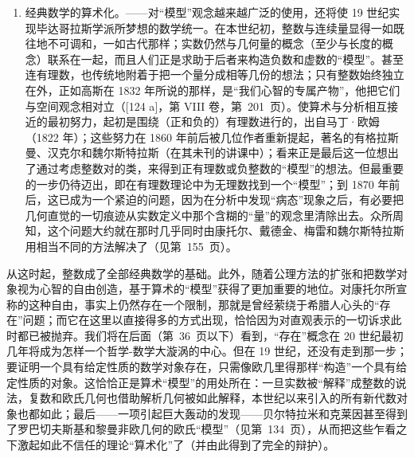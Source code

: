 \begin{enumerate}
\item
  经典数学的算术化。——对“模型”观念越来越广泛的使用，还将使 19 世纪实现毕达哥拉斯学派所梦想的数学统一。在本世纪初，整数与连续量显得一如既往地不可调和，一如古代那样；实数仍然与几何量的概念（至少与长度的概念）联系在一起，而且人们正是求助于后者来构造负数和虚数的“模型”。甚至连有理数，也传统地附着于把一个量分成相等几份的想法；只有整数始终独立在外，正如高斯在 1832 年所说的那样，是“我们心智的专属产物”，他把它们与空间观念相对立（{[}124 a{]}，第 VIII 卷，第~201~页）。使算术与分析相互接近的最初努力，起初是围绕（正和负的）有理数进行的，出自马丁·欧姆（1822 年）；这些努力在 1860 年前后被几位作者重新提起，著名的有格拉斯曼、汉克尔和魏尔斯特拉斯（在其未刊的讲课中）；看来正是最后这一位想出了通过考虑整数对的类，来得到正有理数或负整数的“模型”的想法。但最重要的一步仍待迈出，即在有理数理论中为无理数找到一个“模型”；到 1870 年前后，这已成为一个紧迫的问题，因为在分析中发现“病态”现象之后，有必要把几何直觉的一切痕迹从实数定义中那个含糊的“量”的观念里清除出去。众所周知，这个问题大约就在那时几乎同时由康托尔、戴德金、梅雷和魏尔斯特拉斯用相当不同的方法解决了（见第~155~页）。
\end{enumerate}

从这时起，整数成了全部经典数学的基础。此外，随着公理方法的扩张和把数学对象视为心智的自由创造，基于算术的“模型”获得了更加重要的地位。对康托尔所宣称的这种自由，事实上仍然存在一个限制，那就是曾经萦绕于希腊人心头的“存在”问题；而它在这里以直接得多的方式出现，恰恰因为对直观表示的一切诉求此时都已被抛弃。我们将在后面（第~36~页以下）看到，“存在”概念在 20 世纪最初几年将成为怎样一个哲学-数学大漩涡的中心。但在 19 世纪，还没有走到那一步；要证明一个具有给定性质的数学对象存在，只需像欧几里得那样“构造”一个具有给定性质的对象。这恰恰正是算术“模型”的用处所在：一旦实数被“解释”成整数的说法，复数和欧氏几何也借助解析几何被如此解释，本世纪以来引入的所有新代数对象也都如此；最后——一项引起巨大轰动的发现——贝尔特拉米和克莱因甚至得到了罗巴切夫斯基和黎曼非欧几何的欧氏“模型”（见第~134~页），从而把这些乍看之下激起如此不信任的理论“算术化”了（并由此得到了完全的辩护）。

